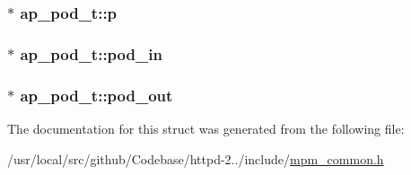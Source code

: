 \subsubsection[{\texorpdfstring{p}{p}}]{$\ast$ ap\+\_\+pod\+\_\+t\+::p}\hypertarget{structap__pod__t_aec4f374a02aaa9e6e87b8fce2d8c1855}{}\label{structap__pod__t_aec4f374a02aaa9e6e87b8fce2d8c1855}
\subsubsection[{\texorpdfstring{pod\+\_\+in}{pod_in}}]{$\ast$ ap\+\_\+pod\+\_\+t\+::pod\+\_\+in}\hypertarget{structap__pod__t_aabb1dac17c04b94b077a7200408fa075}{}\label{structap__pod__t_aabb1dac17c04b94b077a7200408fa075}
\subsubsection[{\texorpdfstring{pod\+\_\+out}{pod_out}}]{$\ast$ ap\+\_\+pod\+\_\+t\+::pod\+\_\+out}\hypertarget{structap__pod__t_af3abbe10bc2f22a68e356313d5085c10}{}\label{structap__pod__t_af3abbe10bc2f22a68e356313d5085c10}


The documentation for this struct was generated from the following file\+:\begin{DoxyCompactItemize}
\item 
/usr/local/src/github/\+Codebase/httpd-\/2../include/\hyperlink{mpm__common_8h}{mpm\+\_\+common.\+h}\end{DoxyCompactItemize}
